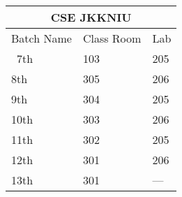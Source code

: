 \documentclass{article}
\begin{document}
\begin{tabular}{ |p{3cm}|p{3cm}|p{3cm}|  }
\hline
\multicolumn{3}{|c|}{CSE JKKNIU} \\
\hline
Batch Name  & Class Room & Lab \\
\hline
\ 7th & 103 & 205 \\
8th & 305   & 206 \\
9th & 304 & 205 \\
10th   & 303 & 206 \\
11th & 302 & 205 \\
12th & 301 & 206   \\
13th & 301 & --- \\
\hline
\end{tabular}
\end{document}
